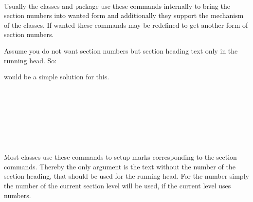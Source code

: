 \begin{Declaration}
  \\
  \\
  \\
  \\
  \\
  \\
\end{Declaration}
%
%
%
%
%
%
%
Usually the \KOMAScript{} classes and package  use these
commands internally to bring the section numbers into wanted form and
additionally they support the  mechanism of the \KOMAScript{}
classes. If wanted these commands may be redefined to get another form of
section numbers.%
%
\begin{Example}
  Assume you do not want section numbers but section heading text only in the
  running head. So:
\begin{lstcode}
  \renewcommand*{\sectionmarkformat}{}
\end{lstcode}
  would be a simple solution for this.
\end{Example}
%
%
%
%
%
%
%
%

\begin{Declaration}
  \\
  \\
  \\
  \\
  \\
  \\
\end{Declaration}
%
%
%
%
%
%
%
Most classes use these commands to setup marks corresponding to the
section commands. Thereby the only argument is the text without the number of
the section heading, that should be used for the running head. For the number
simply the number of the current section level will be used, if the current
level uses numbers.


